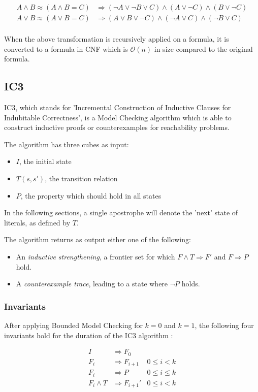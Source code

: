 \documentclass[a4paper]{article}
\begin{document}
\begin{align*}
A \land B \approx (A \land B = C) &\Rightarrow (\lnot A \lor \lnot B \lor C) \land (A \lor \lnot C) \land (B \lor \lnot C)\\
A \lor B \approx (A \lor B = C) &\Rightarrow (A \lor B \lor \lnot C) \land (\lnot A \lor  C) \land (\lnot B \lor   C)\\
\end{align*}

When the above transformation is recursively applied on a formula, it is converted to a formula in CNF which is $\mathcal{O}(n)$ in size compared to the original formula.

\subsection{IC3}
IC3, which stands for 'Incremental Construction of Inductive Clauses for Indubitable Correctness', is a Model Checking algorithm which is able to construct inductive proofs or counterexamples for reachability problems.

The algorithm has three cubes as input:
\begin{itemize}
\item $I$, the initial state
\item $T(s,s')$, the transition relation
\item $P$, the property which should hold in all states
\end{itemize}

In the following sections, a single apostrophe will denote the 'next' state of literals, as defined by $T$.

The algorithm returns as output either one of the following:
\begin{itemize}
\item An \emph{inductive strengthening}, a frontier set for which $F \land T \Rightarrow F'$ and $F \Rightarrow P$ hold.
\item A \emph{counterexample trace}, leading to a state where $\lnot P$ holds.
\end{itemize}

\subsubsection{Invariants}
After applying Bounded Model Checking for $k=0$ and $k=1$, the following four invariants hold for the duration of the IC3 algorithm \cite{Bradley2011}:

\setcounter{equation}{0}
\begin{align}
I &\Rightarrow F_0\\
F_i &\Rightarrow F_{i+1} & 0 \leq i < k\\
F_i &\Rightarrow P & 0 \leq i \leq k\\
F_i \land T &\Rightarrow F_{i+1}' & 0 \leq i < k
\end{align}
\end{document}
